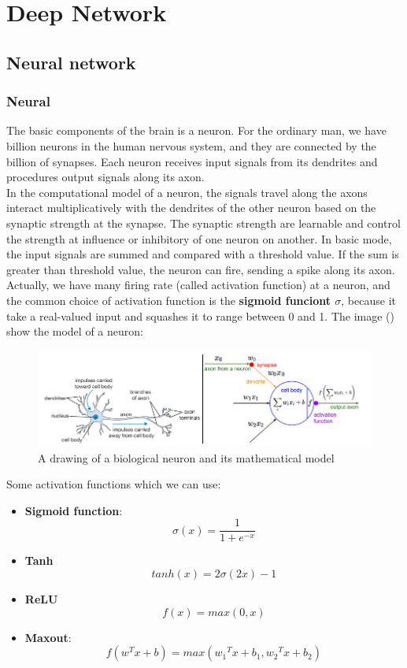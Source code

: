 \chapter{Deep Network}
\section{Neural network}
\subsection{Neural}
The basic components of the brain is a neuron. For the ordinary man, we have billion neurons in the human nervous system, and they are connected by the billion of synapses. Each neuron receives input signals from its dendrites and procedures output signals along its axon.\\[0.2cm]
In the computational model of a neuron, the signals travel along the axons interact multiplicatively with the dendrites of the other neuron based on the synaptic strength at the synapse. The synaptic strength are learnable and control the strength at influence or inhibitory of one neuron on another. In basic mode, the input signals are summed and compared with a threshold value. If the sum is greater than threshold value, the neuron can fire, sending a spike along its axon. Actually, we have many firing rate (called activation function) at a neuron, and the common choice of activation function is the \textbf{sigmoid funciont $\sigma$}, because it take a real-valued input and squashes it to range between 0 and 1. The image () show the model of a neuron:
\begin{figure}[h]
	\centering
	\includegraphics[scale=0.5]{images/neurons.png}
	\caption{A drawing of a biological neuron and its mathematical model}
	\label{fignneuron}
\end{figure}
Some activation functions which we can use:
\begin{itemize}
	\item \textbf{Sigmoid function}:
		\begin{equation}
			\sigma(x) = \frac{1}{1+e^{-x}}
		\end{equation}
	\item \textbf{Tanh}
		\begin{equation}
			tanh(x) = 2\sigma(2x) - 1
		\end{equation}
	\item \textbf{ReLU}
		\begin{equation}
			f(x) = max(0,x)
		\end{equation}
	\item \textbf{Maxout}:
		\begin{equation}
			f(w^Tx + b) = max({w_1}^Tx + b_1,{w_2}^Tx + b_2)
		\end{equation}
\end{itemize}
